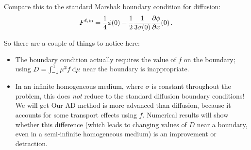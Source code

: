 Compare this to the standard Marshak boundary condition for diffusion:
\begin{equation*}
  F^{\ell,\mathrm{in}}
  = \frac{1}{4} \phi(0)
  - \frac{1}{2} \frac{1}{3\sigma(0)} \frac{\partial \phi}{\partial x}(0) \,.
\end{equation*}

So there are a couple of things to notice here:
\begin{itemize}
  \item The boundary condition actually requires the value of $f$ on the
    boundary; using $D=\int_{-1}^{1} \mu^2 f \mathop{}\!\mathrm{d} \mu$ near the boundary is
    inappropriate.
  \item In an infinite homogeneous medium, where $\sigma$ is constant
    throughout the problem, this does \emph{not} reduce to the standard
    diffusion boundary conditions! We will get 
    Our AD method is more advanced than
    diffusion, because it accounts for some transport effects using $f$.
    Numerical results will show whether this difference (which leads to
    changing values of $D$ near a boundary, even in a semi-infinite
    homogeneous medium) is an improvement or detraction.
\end{itemize}
